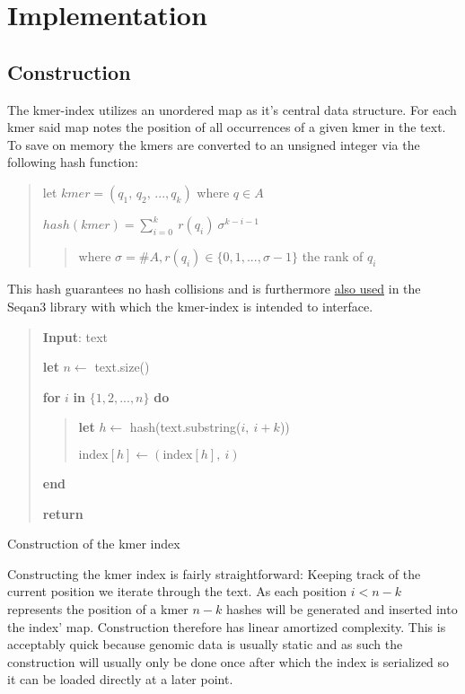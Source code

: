 \chapter{Implementation}
\section{Construction}
The kmer-index utilizes an unordered map as it's central data structure.
For each kmer said map notes the position of all occurrences of a given kmer in the text.
To save on memory the kmers are converted to an unsigned integer via
the following hash function:
\begin{verse}
let $kmer =(q_{1},\,q_{2},\,...,q_{k})$ where $q\in A$

$hash(kmer) = \sum_{i=0}^{k}\:r(q_{i})\:\sigma^{k-i-1}$
\begin{verse}
where $\sigma=\#A,r(q_{i})\in\{0,1,...,\sigma-1\}$ the rank of $q_{i}$
\end{verse}
\end{verse}
This hash guarantees no hash collisions and is furthermore
\href{http://docs.seqan.de/seqan/3-master-user/group__views.html\#ga6e598d6a021868f704d39df73252974f}{also used} in the Seqan3
library with which the kmer-index is intended to interface.

\begin{algorithm}[H]
\begin{verse}
\textbf{Input}: text

\textbf{let} $n\leftarrow$ text.size()

\textbf{for} $i$ \textbf{in} $\{1,2,...,n\}$ \textbf{do}
\begin{verse}
\textbf{let} $h\leftarrow$ hash(text.substring($i,\:i+k$))

$\text{index}[h]\leftarrow(\text{index}[h],\:i)$
\end{verse}

\textbf{end}

\textbf{return}
\end{verse}
\caption{Construction of the kmer index}
\end{algorithm}

Constructing the kmer index is fairly straightforward: Keeping track of the current position we iterate through the text.
As each position $i<n-k$ represents the position of a kmer $n-k$ hashes will be generated and inserted into the index' map.
Construction therefore has linear amortized complexity. This is acceptably quick because genomic data is usually static and as such
the construction will usually only be done once after which the index is serialized so it can be loaded directly at a later point.